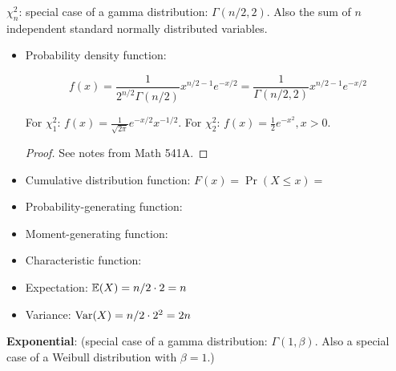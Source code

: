 \textbf{\(\chi_n^2\)}: special case of a gamma distribution: \(\Gamma(n/2, 2)\). Also the sum of \(n\) independent standard normally distributed variables.

\begin{itemize}

\item Probability density function: 

\[
f(x)  = \frac{1}{2^{n/2}\Gamma(n/2)} x^{n/2 - 1} e^{-x/2} = \frac{1}{\Gamma(n/2, 2)} x^{n/2 - 1} e^{-x/2}
\]

For \(\chi_1^2\): \(f(x) = \frac{1}{\sqrt{2\pi}} e^{-x/2}x^{-1/2} \). For \(\chi_2^2\): \(f(x) = \frac{1}{2}e^{-x^2}, x > 0\). 

\begin{proof} See notes from Math 541A. \end{proof}

\item Cumulative distribution function: \(F(x) = \Pr(X \leq x) = \)

\item Probability-generating function:

\item Moment-generating function:

\item Characteristic function:

\item Expectation: \(\E(X) = n/2 \cdot 2 = n \)

\item Variance: \(\Var(X) = n/2 \cdot 2^2 = 2n\)

\end{itemize}


\textbf{Exponential}: \label{prob.exp} (special case of a gamma distribution: \(\Gamma(1, \beta)\). Also a special case of a Weibull distribution with \(\beta = 1\).)

